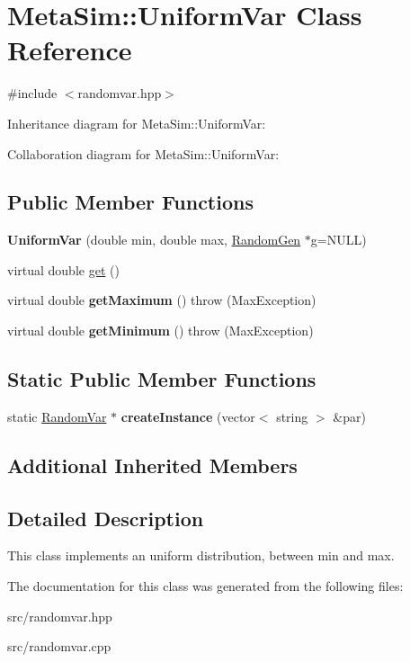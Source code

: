\hypertarget{classMetaSim_1_1UniformVar}{}\section{Meta\+Sim\+:\+:Uniform\+Var Class Reference}
\label{classMetaSim_1_1UniformVar}


{\ttfamily \#include $<$randomvar.\+hpp$>$}



Inheritance diagram for Meta\+Sim\+:\+:Uniform\+Var\+:


Collaboration diagram for Meta\+Sim\+:\+:Uniform\+Var\+:
\subsection*{Public Member Functions}
\begin{DoxyCompactItemize}
\item 
{\bfseries Uniform\+Var} (double min, double max, \hyperlink{classMetaSim_1_1RandomGen}{Random\+Gen} $\ast$g=N\+U\+LL)
\item 
virtual double \hyperlink{group__metasim__random_gacc8e14498f0e48cbece5f65f52c65020}{get} ()
\item 
virtual double {\bfseries get\+Maximum} ()  throw (\+Max\+Exception)
\item 
virtual double {\bfseries get\+Minimum} ()  throw (\+Max\+Exception)
\end{DoxyCompactItemize}
\subsection*{Static Public Member Functions}
\begin{DoxyCompactItemize}
\item 
static \hyperlink{classMetaSim_1_1RandomVar}{Random\+Var} $\ast$ {\bfseries create\+Instance} (vector$<$ string $>$ \&par)
\end{DoxyCompactItemize}
\subsection*{Additional Inherited Members}


\subsection{Detailed Description}
This class implements an uniform distribution, between min and max. 

The documentation for this class was generated from the following files\+:\begin{DoxyCompactItemize}
\item 
src/randomvar.\+hpp\item 
src/randomvar.\+cpp\end{DoxyCompactItemize}

